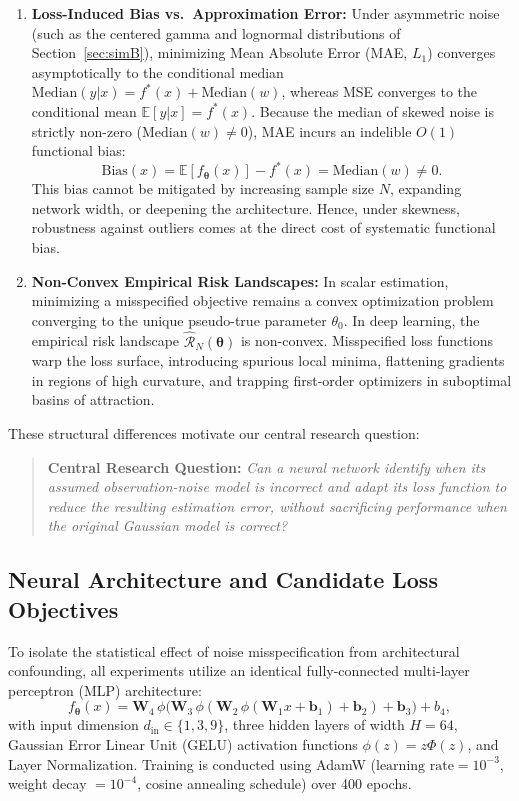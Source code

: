 \begin{enumerate}
  \item \textbf{Loss-Induced Bias vs.\ Approximation Error:} Under asymmetric noise (such as the centered gamma and lognormal distributions of Section~\ref{sec:simB}), minimizing Mean Absolute Error (MAE, $L_1$) converges asymptotically to the conditional median $\text{Median}(y|x) = f^*(x) + \text{Median}(w)$, whereas MSE converges to the conditional mean $\mathbb{E}[y|x] = f^*(x)$. Because the median of skewed noise is strictly non-zero ($\text{Median}(w) \neq 0$), MAE incurs an indelible $O(1)$ functional bias:
  \begin{equation}
    \text{Bias}(x) = \mathbb{E}[f_{\boldsymbol{\theta}}(x)] - f^*(x) = \text{Median}(w) \neq 0.
  \end{equation}
  This bias cannot be mitigated by increasing sample size $N$, expanding network width, or deepening the architecture. Hence, under skewness, robustness against outliers comes at the direct cost of systematic functional bias.

  \item \textbf{Non-Convex Empirical Risk Landscapes:} In scalar estimation, minimizing a misspecified objective remains a convex optimization problem converging to the unique pseudo-true parameter $\theta_0$. In deep learning, the empirical risk landscape $\hat{\mathcal{R}}_N(\boldsymbol{\theta})$ is non-convex. Misspecified loss functions warp the loss surface, introducing spurious local minima, flattening gradients in regions of high curvature, and trapping first-order optimizers in suboptimal basins of attraction.
\end{enumerate}

These structural differences motivate our central research question:
\begin{quote}
  \textbf{Central Research Question:} \emph{Can a neural network identify when its assumed observation-noise model is incorrect and adapt its loss function to reduce the resulting estimation error, without sacrificing performance when the original Gaussian model is correct?}
\end{quote}

\subsection{Neural Architecture and Candidate Loss Objectives}
\label{sec:nn_architecture}

To isolate the statistical effect of noise misspecification from architectural confounding, all experiments utilize an identical fully-connected multi-layer perceptron (MLP) architecture:
\begin{equation}
  f_{\boldsymbol{\theta}}(x) = \mathbf{W}_4 \, \phi\big(\mathbf{W}_3 \, \phi(\mathbf{W}_2 \, \phi(\mathbf{W}_1 x + \mathbf{b}_1) + \mathbf{b}_2) + \mathbf{b}_3\big) + b_4,
\end{equation}
with input dimension $d_{\text{in}} \in \{1, 3, 9\}$, three hidden layers of width $H=64$, Gaussian Error Linear Unit (GELU) activation functions $\phi(z) = z \Phi(z)$, and Layer Normalization. Training is conducted using AdamW ($\text{learning rate} = 10^{-3}$, weight decay $= 10^{-4}$, cosine annealing schedule) over 400 epochs.


